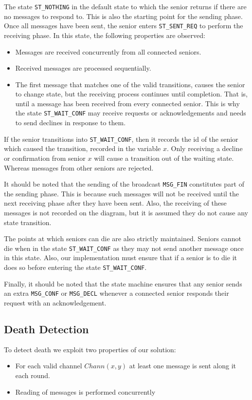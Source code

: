 \documentclass[12pt,a4paper]{scrartcl}
\begin{document}
The state \texttt{ST\_NOTHING} in the default state to which the senior returns if there are no messages to respond to.
This is also the starting point for the sending phase. Once all messages have been sent, the senior enters \texttt{ST\_SENT\_REQ} to perform the receiving phase.
In this state, the following properties are observed:
\begin{itemize}
    \item Messages are received concurrently from all connected seniors.
    \item Received messages are processed sequentially.
    \item The first message that matches one of the valid transitions, causes the senior to change state, but the receiving process continues until completion.
          That is, until a message has been received from every connected senior.
          This is why the state \texttt{ST\_WAIT\_CONF} may receive requests or acknowledgements and needs to send declines in response to them.
\end{itemize}

If the senior transitions into \texttt{ST\_WAIT\_CONF}, then it records the id of the senior which caused the transition, recorded in the variable $x$.
Only receiving a decline or confirmation from senior $x$ will cause a transition out of the waiting state.
Whereas messages from other seniors are rejected.

It should be noted that the sending of the broadcast \texttt{MSG\_FIN} constitutes part of the sending phase.
This is because such messages will not be received until the next receiving phase after they have been sent.
Also, the receiving of these messages is not recorded on the diagram, but it is assumed they do not cause any state transition.

The points at which seniors can die are also strictly maintained.
Seniors cannot die when in the state \texttt{ST\_WAIT\_CONF} as they may not send another message once in this state.
Also, our implementation must ensure that if a senior is to die it does so before entering the state \texttt{ST\_WAIT\_CONF}.

Finally, it should be noted that the state machine ensures that any senior sends an extra \texttt{MSG\_CONF} or \texttt{MSG\_DECL} whenever a connected senior responds their request with an acknowledgement.

\subsection{Death Detection}
To detect death we exploit two properties of our solution:
\begin{itemize}
    \item For each valid channel $Chann(x,y)$ at least one message is sent along it each round.
    \item Reading of messages is performed concurrently
\end{itemize}
\end{document}
